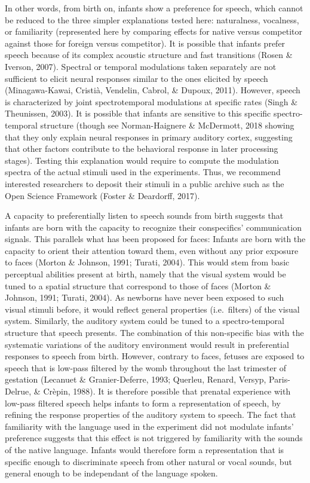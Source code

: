 \documentclass[man]{apa6}
\begin{document}
In other words, from birth on, infants show a preference for speech, which cannot be reduced to the three simpler explanations tested here: naturalness, vocalness, or familiarity (represented here by comparing effects for native versus competitor against those for foreign versus competitor). It is possible that infants prefer speech because of its complex acoustic structure and fast transitions (Rosen \& Iverson, 2007). Spectral or temporal modulations taken separately are not sufficient to elicit neural responses similar to the ones elicited by speech (Minagawa-Kawai, Cristià, Vendelin, Cabrol, \& Dupoux, 2011). However, speech is characterized by joint spectrotemporal modulations at specific rates (Singh \& Theunissen, 2003). It is possible that infants are sensitive to this specific spectro-temporal structure (though see Norman-Haignere \& McDermott, 2018 showing that they only explain neural responses in primary auditory cortex, suggesting that other factors contribute to the behavioral response in later processing stages). Testing this explanation would require to compute the modulation spectra of the actual stimuli used in the experiments. Thus, we recommend interested researchers to deposit their stimuli in a public archive such as the Open Science Framework (Foster \& Deardorff, 2017).

A capacity to preferentially listen to speech sounds from birth suggests that infants are born with the capacity to recognize their conspecifics' communication signals. This parallels what has been proposed for faces: Infants are born with the capacity to orient their attention toward them, even without any prior exposure to faces (Morton \& Johnson, 1991; Turati, 2004). This would stem from basic perceptual abilities present at birth, namely that the visual system would be tuned to a spatial structure that correspond to those of faces (Morton \& Johnson, 1991; Turati, 2004). As newborns have never been exposed to such visual stimuli before, it would reflect general properties (i.e.~filters) of the visual system. Similarly, the auditory system could be tuned to a spectro-temporal structure that speech presents. The combination of this non-specific bias with the systematic variations of the auditory environment would result in preferential responses to speech from birth. However, contrary to faces, fetuses are exposed to speech that is low-pass filtered by the womb throughout the last trimester of gestation (Lecanuet \& Granier-Deferre, 1993; Querleu, Renard, Versyp, Paris-Delrue, \& Crèpin, 1988). It is therefore possible that prenatal experience with low-pass filtered speech helps infants to form a representation of speech, by refining the response properties of the auditory system to speech.
The fact that familiarity with the language used in the experiment did not modulate infants' preference suggests that this effect is not triggered by familiarity with the sounds of the native language. Infants would therefore form a representation that is specific enough to discriminate speech from other natural or vocal sounds, but general enough to be independant of the language spoken.
\end{document}
